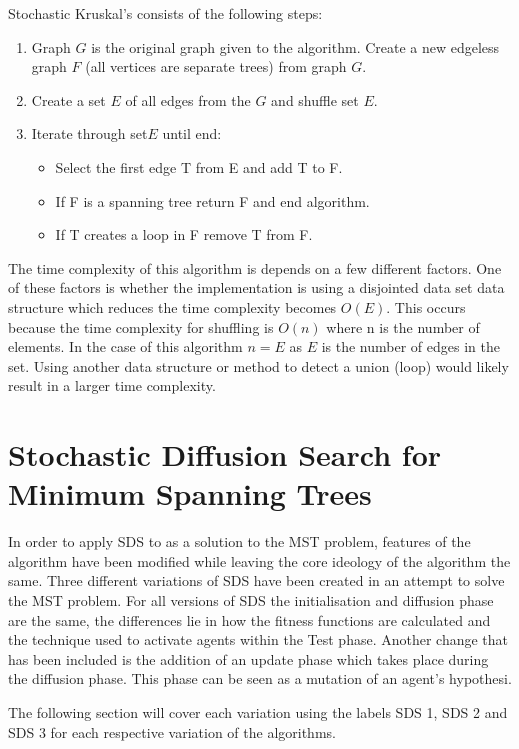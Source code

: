 \documentclass{AISB2008}
\begin{document}
{Stochastic Kruskal’s consists of the following steps:

\begin{enumerate}
\item Graph {$G$} is the original graph given to the algorithm. Create a new edgeless graph {$F$} (all vertices are separate trees) from graph {$G$}.
\item Create a set {$E$} of all edges from the {$G$} and shuffle set {$E$}.
\item Iterate through set{$E$} until end:
\begin{itemize}
\item Select the first edge T from E and add T to F.
\item If F is a spanning tree return F and end algorithm.
\item If T creates a loop in F remove T from F.
\end{itemize}
\end{enumerate}

The time complexity of this algorithm is depends on a few different factors. One of these factors is whether the implementation is using a disjointed data set data structure which reduces the time complexity becomes {$O (E)$}. This occurs because the time complexity for shuffling is {$O (n)$} where n is the number of elements. In the case of this algorithm {$n = E$} as {$E$} is the number of edges in the set. Using another data structure or method to detect a union (loop) would likely result in a larger time complexity. 

\section{Stochastic Diffusion Search for Minimum Spanning Trees}
\label{SDS for MST}

In order to apply SDS to as a solution to the MST problem, features of the algorithm have been modified while leaving the core ideology of the algorithm the same. Three different variations of SDS have been created in an attempt to solve the MST problem. For all versions of SDS the initialisation and diffusion phase are the same, the differences lie in how the fitness functions are calculated and the technique used to activate agents within the Test phase. Another change that has been included is the addition of an update phase which takes place during the diffusion phase. This phase can be seen as a mutation of an agent’s hypothesi.

The following section will cover each variation using the labels SDS 1, SDS 2 and SDS 3 for each respective variation of the algorithms.

}
\end{document}
